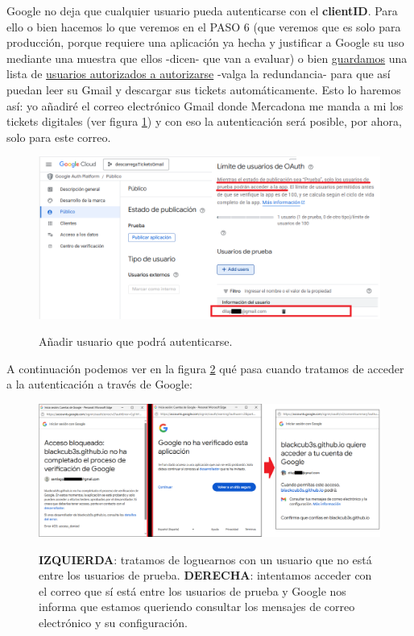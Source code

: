 \documentclass[a4paper,12pt]{report}
\begin{document}
	Google no deja que cualquier usuario pueda autenticarse con el \textbf{clientID}. Para ello o bien hacemos lo que veremos en el PASO 6 (que veremos que es solo para producción, porque requiere una aplicación ya hecha y justificar a Google su uso mediante una muestra que ellos -dicen- que van a evaluar) o bien \underline{guardamos} una lista de \underline{usuarios autorizados a autorizarse} -valga la redundancia- para que así puedan leer su Gmail y descargar sus tickets automáticamente. Esto lo haremos así: yo añadiré el correo electrónico Gmail donde Mercadona me manda a mi los tickets digitales (ver figura \ref{fig:googleCloudB}) y con eso la autenticación será posible, por ahora, solo para este correo.
	
	\FloatBarrier
	\setlength{\belowcaptionskip}{3pt}
	\begin{figure}[H]
		\centering
		\caption{Añadir usuario que podrá autenticarse.}
		\includegraphics[width=1\linewidth]{img/googleCloudB}
		\label{fig:googleCloudB}
	\end{figure}
	\FloatBarrier
	
	A continuación podemos ver en la figura \ref{fig:googleCloudI} qué pasa cuando tratamos de acceder a la autenticación a través de Google:
	
	
	
	
	\FloatBarrier
	\setlength{\belowcaptionskip}{3pt}
	\begin{figure}[H]
		\centering
		\caption{\textbf{IZQUIERDA}: tratamos de loguearnos con un usuario que no está entre los usuarios de prueba. \textbf{DERECHA}: intentamos acceder con el correo que sí está entre los usuarios de prueba y Google nos informa que estamos queriendo consultar los mensajes de correo electrónico y su configuración.}
		\includegraphics[width=1\linewidth]{img/googleCloudI}
		\label{fig:googleCloudI}
	\end{figure}
	\FloatBarrier
	
\end{document}
